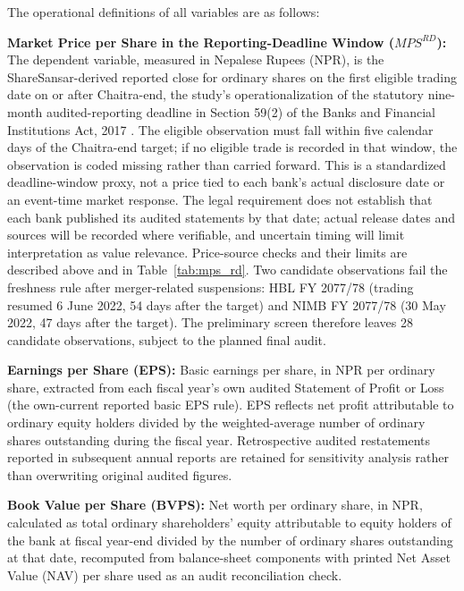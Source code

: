 

The operational definitions of all variables are as follows:

\textbf{Market Price per Share in the Reporting-Deadline Window ($\mathit{MPS}^{RD}$):} The dependent variable, measured in Nepalese Rupees (NPR), is the ShareSansar-derived reported close for ordinary shares on the first eligible trading date on or after Chaitra-end, the study's operationalization of the statutory nine-month audited-reporting deadline in Section 59(2) of the Banks and Financial Institutions Act, 2017 \citep{bafia2017}. The eligible observation must fall within five calendar days of the Chaitra-end target; if no eligible trade is recorded in that window, the observation is coded missing rather than carried forward. This is a standardized deadline-window proxy, not a price tied to each bank's actual disclosure date or an event-time market response. The legal requirement does not establish that each bank published its audited statements by that date; actual release dates and sources will be recorded where verifiable, and uncertain timing will limit interpretation as value relevance. Price-source checks and their limits are described above and in Table~\ref{tab:mps_rd}. Two candidate observations fail the freshness rule after merger-related suspensions: HBL FY 2077/78 (trading resumed 6 June 2022, 54 days after the target) and NIMB FY 2077/78 (30 May 2022, 47 days after the target). The preliminary screen therefore leaves 28 candidate observations, subject to the planned final audit.

\textbf{Earnings per Share (EPS):} Basic earnings per share, in NPR per ordinary share, extracted from each fiscal year's own audited Statement of Profit or Loss (the own-current reported basic EPS rule). EPS reflects net profit attributable to ordinary equity holders divided by the weighted-average number of ordinary shares outstanding during the fiscal year. Retrospective audited restatements reported in subsequent annual reports are retained for sensitivity analysis rather than overwriting original audited figures.

\textbf{Book Value per Share (BVPS):} Net worth per ordinary share, in NPR, calculated as total ordinary shareholders' equity attributable to equity holders of the bank at fiscal year-end divided by the number of ordinary shares outstanding at that date, recomputed from balance-sheet components with printed Net Asset Value (NAV) per share used as an audit reconciliation check.

